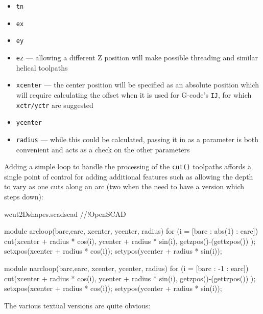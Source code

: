 \documentclass{ltxdoc}
\begin{document}
\begin{itemize}
 \item \texttt{tn}
 \item \texttt{ex}
 \item \texttt{ey}
 \item \texttt{ez} --- allowing a different Z position will make possible threading and
                       similar helical toolpaths
\item \texttt{xcenter} --- the center position will be specified as an absolute position
      which will require calculating the offset when it is used for G-code's \texttt{IJ},
      for which \texttt{xctr/yctr} are suggested 
\item \texttt{ycenter}
\item \texttt{radius} --- while this could be calculated, passing it in as a parameter
      is both convenient and acts as a check on the other parameters
\end{itemize}

Adding a simple loop to handle the processing of the \texttt{cut()} toolpaths affords 
a single point of control for adding additional features such as allowing the depth to 
vary as one cuts along an arc (two when the need to have a version which steps down):

\lstset{firstnumber=1}
\begin{writecode}{w}{cut2Dshapes.scad}{scad}
//!OpenSCAD

module arcloop(barc,earc, xcenter, ycenter, radius) {
  for (i = [barc : abs(1) : earc]) {
        cut(xcenter + radius * cos(i),
        ycenter + radius * sin(i),
        getzpos()-(gettzpos())
        );
    setxpos(xcenter + radius * cos(i));
    setypos(ycenter + radius * sin(i));
  }
}

module narcloop(barc,earc, xcenter, ycenter, radius) {
  for (i = [barc : -1 : earc]) {
        cut(xcenter + radius * cos(i),
        ycenter + radius * sin(i),
        getzpos()-(gettzpos())
        );
    setxpos(xcenter + radius * cos(i));
    setypos(ycenter + radius * sin(i));
  }
}

\end{writecode}
\addtocounter{cuttwod}{25}
 
The various textual versions are quite obvious:
\end{document}
